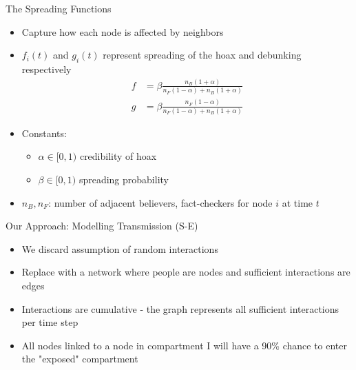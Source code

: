\documentclass{beamer}
\begin{document}
\begin{frame}{The Spreading Functions}
    \begin{itemize}
        \item Capture how each node is affected by neighbors
        \item $f_{i}(t)$ and $g_{i}(t)$ represent spreading of the hoax and debunking respectively
        \begin{align*}
            f &= \beta \frac{n_{B}(1 + \alpha)}{n_{F}(1 - \alpha) + n_{B}(1 + \alpha)} \\
            g &= \beta \frac{n_{F}(1 - \alpha)}{n_{F}(1 - \alpha) + n_{B}(1 + \alpha)}
        \end{align*}
        \item Constants:
        \begin{itemize}
            \item $\alpha \in [0,1)$ credibility of hoax 
            \item $\beta \in [0,1)$ spreading probability
        \end{itemize}
        \item $n_{B},n_{F}$: number of adjacent believers, fact-checkers for node $i$ at time $t$
    \end{itemize}
\end{frame}

\begin{frame}{Our Approach: Modelling Transmission (S-E)}
\begin{itemize}
    \item We discard assumption of random interactions
    \item Replace with a network where people are nodes and sufficient interactions are edges
    \item Interactions are cumulative - the graph represents all sufficient interactions per time step
    \item All nodes linked to a node in compartment I will have a 90\% chance to enter the "exposed" compartment
\end{itemize}
\end{frame}
\end{document}
